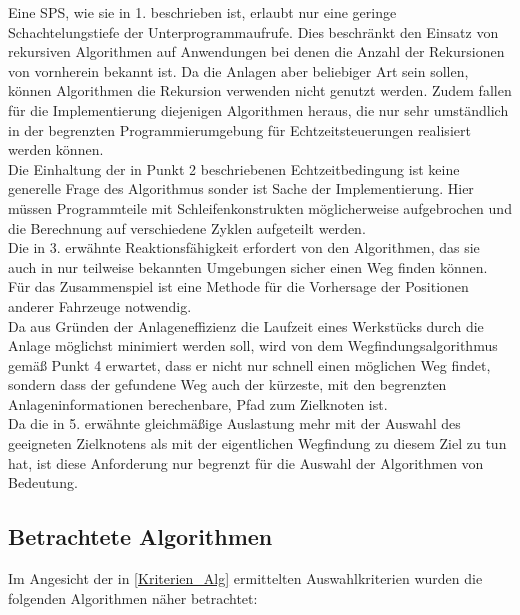 		Eine \ac{SPS}, wie sie in 1. beschrieben ist, erlaubt nur eine geringe Schachtelungstiefe der Unterprogrammaufrufe. Dies beschränkt den Einsatz von rekursiven Algorithmen auf Anwendungen bei denen die Anzahl der Rekursionen von vornherein bekannt ist. Da die Anlagen aber beliebiger Art sein sollen, können Algorithmen die Rekursion verwenden nicht genutzt werden. Zudem fallen für die Implementierung diejenigen Algorithmen heraus, die nur sehr umständlich in der begrenzten Programmierumgebung für Echtzeitsteuerungen realisiert werden können.\\
		Die Einhaltung der in Punkt 2 beschriebenen Echtzeitbedingung ist keine generelle Frage des Algorithmus sonder ist Sache der Implementierung. Hier müssen Programmteile mit Schleifenkonstrukten möglicherweise aufgebrochen und die Berechnung auf verschiedene Zyklen aufgeteilt werden.\\
		Die in 3. erwähnte Reaktionsfähigkeit erfordert von den Algorithmen, das sie auch in nur teilweise bekannten Umgebungen sicher einen Weg finden können. Für das Zusammenspiel ist eine Methode für die Vorhersage der Positionen anderer Fahrzeuge notwendig.\\
		Da aus Gründen der Anlageneffizienz die Laufzeit eines Werkstücks durch die Anlage möglichst minimiert werden soll, wird von dem Wegfindungsalgorithmus gemäß Punkt 4 erwartet, dass er nicht nur schnell einen möglichen Weg findet, sondern dass der gefundene Weg auch der kürzeste, mit den begrenzten Anlageninformationen berechenbare, Pfad zum Zielknoten ist.\\
		Da die in 5. erwähnte gleichmäßige Auslastung mehr mit der Auswahl des geeigneten Zielknotens als mit der eigentlichen Wegfindung zu diesem Ziel zu tun hat, ist diese Anforderung nur begrenzt für die Auswahl der Algorithmen von Bedeutung.
		
	\subsection{Betrachtete Algorithmen}
		\label{Betrachtete_Algorithmen}
		Im Angesicht der in \ref{Kriterien_Alg} ermittelten Auswahlkriterien wurden die folgenden Algorithmen näher betrachtet:
		
